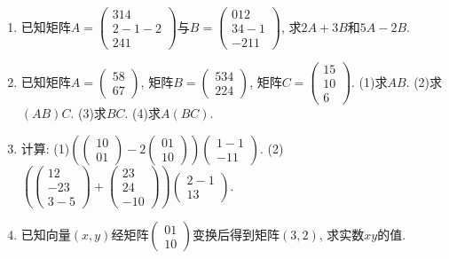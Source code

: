 \documentclass[10pt,a4paper]{article}
\begin{document}
\begin{enumerate}[1.]
\item 已知矩阵$A=\begin{pmatrix}
    3  1  4  \\2  -1  -2  \\2  4  1  \end{pmatrix}$与$B=\begin{pmatrix}
    0  1  2  \\3  4  -1  \\-2  1  1  \end{pmatrix}$, 求$2A+3B$和$5A-2B$.
\item 已知矩阵$A=\begin{pmatrix}
    5  8  \\6  7  \end{pmatrix}$, 矩阵$B=\begin{pmatrix}
    5  3  4  \\2  2  4  \end{pmatrix}$, 矩阵$C=\begin{pmatrix}
    15  \\10  \\6  \end{pmatrix}$.
(1)求$AB$. (2)求$(AB)C$.
(3)求$BC$. (4)求$A(BC)$.
\item 计算:
(1)$(\begin{pmatrix}
    1  0  \\0  1  \end{pmatrix}-2\begin{pmatrix}
    0  1  \\1  0  \end{pmatrix})\begin{pmatrix}
    1  -1  \\-1  1  \end{pmatrix}$.
(2)$(\begin{pmatrix}
    1  2  \\-2  3  \\3  -5  \end{pmatrix}+\begin{pmatrix}
    2  3  \\2  4  \\-1  0  \end{pmatrix})\begin{pmatrix}
    2  -1  \\1  3  \end{pmatrix}$.
\item 已知向量$(x,y)$经矩阵$\begin{pmatrix}
    0  1  \\1  0  \end{pmatrix}$变换后得到矩阵$(3,2)$, 求实数$xy$的值.

\end{enumerate}
\end{document}
